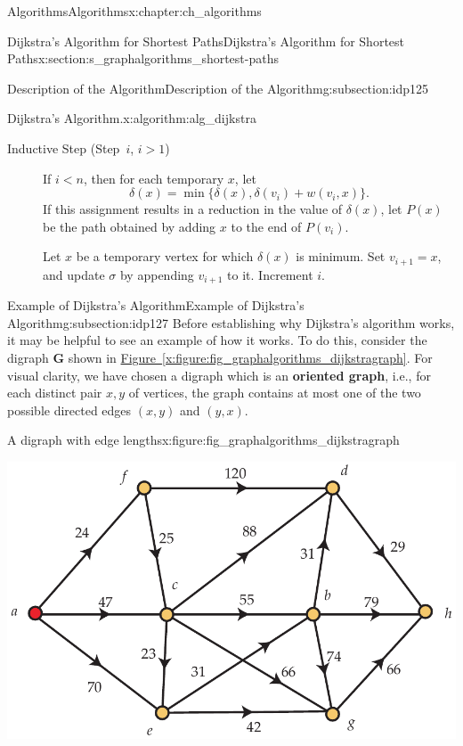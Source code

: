 \documentclass[oneside,10pt,]{book}
\newcommand{\xreffont}{\relax}
\newcommand{\terminology}[1]{\textbf{#1}}
\numberwithin{equation}{section}
\newcommand{\bfG}{\mathbf{G}}
\newcommand{\lt}{<}
\begin{document}
\begin{chapterptx}{Algorithms}{}{Algorithms}{}{}{x:chapter:ch_algorithms}
\begin{sectionptx}{Dijkstra's Algorithm for Shortest Paths}{}{Dijkstra's Algorithm for Shortest Paths}{}{}{x:section:s_graphalgorithms_shortest-paths}
\begin{subsectionptx}{Description of the Algorithm}{}{Description of the Algorithm}{}{}{g:subsection:idp125}
\begin{algorithm}{Dijkstra's Algorithm.}{}{x:algorithm:alg_dijkstra}
\begin{description}
\item[{Inductive Step (Step~\(i\), \(i>1\))}]If \(i\lt n\), then for each temporary \(x\), let%
\begin{equation*}
\delta(x) = \min\{\delta(x), \delta(v_i)+w(v_i,x)\}.
\end{equation*}
If this assignment results in a reduction in the value of \(\delta(x)\), let \(P(x)\) be the path obtained by adding \(x\) to the end of \(P(v_i)\).%
\par
Let \(x\) be a temporary vertex for which \(\delta(x)\) is minimum. Set \(v_{i+1}=x\), and update \(\sigma\) by appending \(v_{i+1}\) to it. Increment \(i\).%
\end{description}
%
\end{algorithm}
\end{subsectionptx}
%
%
\typeout{************************************************}
\typeout{************************************************}
%
\begin{subsectionptx}{Example of Dijkstra's Algorithm}{}{Example of Dijkstra's Algorithm}{}{}{g:subsection:idp127}
Before establishing why Dijkstra's algorithm works, it may be helpful to see an example of how it works. To do this, consider the digraph \(\bfG\) shown in \hyperref[x:figure:fig_graphalgorithms_dijkstragraph]{Figure~{\xreffont\ref{x:figure:fig_graphalgorithms_dijkstragraph}}}. For visual clarity, we have chosen a digraph which is an \terminology{oriented graph}, i.e.\@, for each distinct pair \(x,y\) of vertices, the graph contains at most one of the two possible directed edges \((x,y)\) and \((y,x)\).%
\begin{figureptx}{A digraph with edge lengths}{x:figure:fig_graphalgorithms_dijkstragraph}{}%
\begin{image}{0.075}{0.85}{0.075}%
\includegraphics[width=\linewidth]{images/dijkstragraph}

\end{image}
\end{figureptx}
\end{subsectionptx}
\end{sectionptx}
\end{chapterptx}
\end{document}
